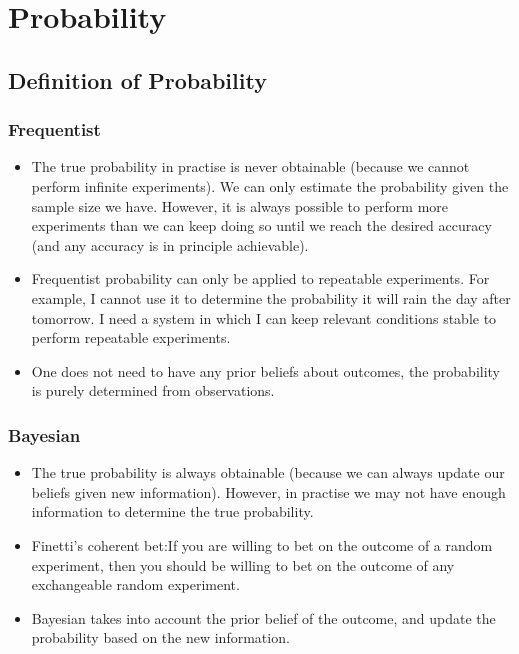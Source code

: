 \documentclass[12pt,a4paper]{article}
\begin{document}
\section{Probability}
\subsection{Definition of Probability}
    \subsubsection{Frequentist}
        \begin{itemize}
            \item The true probability in practise is never obtainable (because we cannot perform infinite experiments). We can only estimate the probability given the sample size we have. However, it is always possible to perform more experiments than we can keep doing so until we reach the desired accuracy (and any accuracy is in principle achievable).
            \item Frequentist probability can only be applied to repeatable experiments. For example, I cannot use it to determine the probability it will rain the day after tomorrow. I need a system in which I can keep relevant conditions stable to perform repeatable experiments.
            \item One does not need to have any prior beliefs about outcomes, the probability is purely determined from observations.
        \end{itemize}
    \subsubsection{Bayesian}

    \begin{itemize}
        \item The true probability is always obtainable (because we can always update our beliefs given new information). However, in practise we may not have enough information to determine the true probability.
        \item Finetti's coherent bet:If you are willing to bet on the outcome of a random experiment, then you should be willing to bet on the outcome of any exchangeable random experiment.
        \item Bayesian takes into account the prior belief of the outcome, and update the probability based on the new information.
    \end{itemize}
\end{document}
